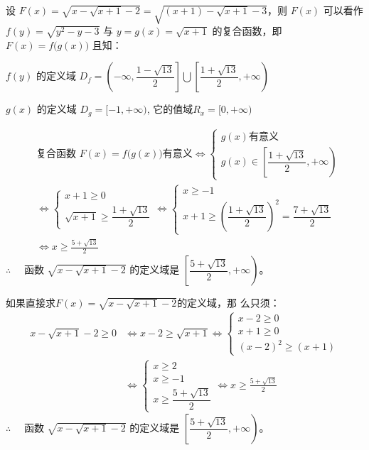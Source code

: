 \begin{solution}
设 $F(x)=\sqrt{x-\sqrt{x+1}-2}=\sqrt{(x+1)-\sqrt{x+1}-3}$，则 $F(x)$ 可以看作$f(y)=\sqrt{y^2-y-3}$ 与 $y=g(x)=\sqrt{x+1}$ 的复合函数，即$F(x)=f\big(g(x)\big)$ 且知：

$f(y)$ 的定义域 $D_f=\left(-\infty,\dfrac{1-\sqrt{13}}{2}\right]\bigcup\left[\dfrac{1+\sqrt{13}}{2},+\infty\right)$

$g(x)$ 的定义域 $D_g=[-1,+\infty)$, 它的值域$R_x=[0,+\infty)$

\[\begin{split}
&\text{复合函数 $F(x)=f\big(g(x)\big)$有意义}\Longleftrightarrow
\begin{cases}
    g(x)\text{有意义}\\
    g(x)\in\left[\dfrac{1+\sqrt{13}}{2},+\infty\right)
\end{cases}\\
&\Longleftrightarrow
\begin{cases}
    x+1\geqslant 0\\
    \sqrt{x+1}\geqslant \dfrac{1+\sqrt{13}}{2}
\end{cases}\Longleftrightarrow
\begin{cases}
    x\geqslant -1\\
    x+1\geqslant \left(\dfrac{1+\sqrt{13}}{2}\right)^2=\dfrac{7+\sqrt{13}}{2}
\end{cases}\\
&\Longleftrightarrow x\geqslant \frac{5+\sqrt{13}}{2}
\end{split}\]
$\therefore\quad $ 函数 $\sqrt{x-\sqrt{x+1}-2}$ 的定义域是
$\left[\dfrac{5+\sqrt{13}}{2},+\infty\right)$。

如果直接求$F(x)=\sqrt{x-\sqrt{x+1}-2}$的定义域，那
么只须：
\[\begin{split}
   x-\sqrt{x+1}-2\geqslant 0& \Longleftrightarrow x-2\geqslant \sqrt{x+1} \Longleftrightarrow \begin{cases}
    x-2\geqslant 0\\ x+1\geqslant 0\\ (x-2)^2\geqslant (x+1)
\end{cases}\\
& \Longleftrightarrow \begin{cases}
    x\geqslant 2\\x\geqslant -1\\ x\geqslant \dfrac{5+\sqrt{13}}{2}
\end{cases} \Longleftrightarrow x\geqslant \frac{5+\sqrt{13}}{2}
\end{split}\]
$\therefore\quad $ 函数 $\sqrt{x-\sqrt{x+1}-2}$ 的定义域是
$\left[\dfrac{5+\sqrt{13}}{2},+\infty\right)$。
\end{solution}

